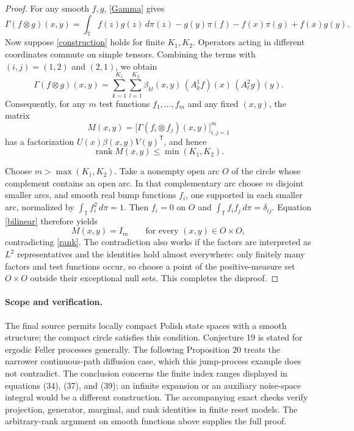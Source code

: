 \documentclass[10pt]{article}
\newcommand{\T}{\mathbb T}
\begin{document}
\begin{proof}
For any smooth \(f,g\), \eqref{Gamma} gives
\begin{equation}\label{bilinear}
 \Gamma(f\otimes g)(x,y)
 =\int_\T f(z)g(z)\,d\pi(z)
   -g(y)\pi(f)-f(x)\pi(g)+f(x)g(y).
\end{equation}
Now suppose \eqref{construction} holds for finite \(K_1,K_2\).
Operators acting in different coordinates commute on simple tensors.
Combining the terms with \((i,j)=(1,2)\) and \((2,1)\), we obtain
\begin{equation}\label{factor}
 \Gamma(f\otimes g)(x,y)
 =\sum_{k=1}^{K_1}\sum_{l=1}^{K_2}
   \beta_{kl}(x,y)\,(A_k^1f)(x)\,(A_l^2g)(y).
\end{equation}
Consequently, for any \(m\) test functions \(f_1,\ldots,f_m\) and
any fixed \((x,y)\), the matrix
\[
 M(x,y)=\bigl[\Gamma(f_i\otimes f_j)(x,y)\bigr]_{i,j=1}^m
\]
has a factorization \(U(x)\beta(x,y)V(y)^{\mathsf T}\), and hence
\begin{equation}\label{rank}
 \operatorname{rank} M(x,y)\leq \min(K_1,K_2).
\end{equation}

Choose \(m>\max(K_1,K_2)\). Take a nonempty open arc \(O\) of the
circle whose complement contains an open arc. In that complementary
arc choose \(m\) disjoint smaller arcs, and smooth real bump functions
\(f_i\), one supported in each smaller arc, normalized by
\(\int_\T f_i^2\,d\pi=1\).
Then \(f_i=0\) on \(O\) and \(\int_\T f_if_j\,d\pi=\delta_{ij}\).
Equation \eqref{bilinear} therefore yields
\[
 M(x,y)=I_m\qquad\text{for every }(x,y)\in O\times O,
\]
contradicting \eqref{rank}.
The contradiction also works if the factors are interpreted as
\(L^2\) representatives and the identities hold almost everywhere:
only finitely many factors and test functions occur, so choose a point
of the positive-measure set \(O\times O\) outside their exceptional
null sets. This completes the disproof.
\end{proof}

\newpage
\paragraph{Scope and verification.}
The final source permits locally compact Polish state spaces with a
smooth structure; the compact circle satisfies this condition.
Conjecture 19 is stated for ergodic Feller processes generally.
The following Proposition 20 treats the narrower continuous-path
diffusion case, which this jump-process example does not contradict.
The conclusion concerns the finite index ranges displayed in
equations (34), (37), and (39); an infinite expansion or an
auxiliary noise-space integral would be a different construction.
The accompanying exact checks verify projection, generator, marginal,
and rank identities in finite reset models. The arbitrary-rank
argument on smooth functions above supplies the full proof.
\end{document}
